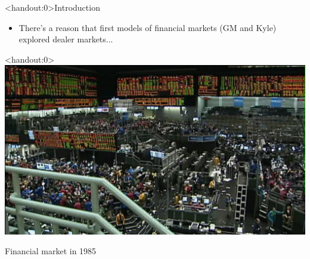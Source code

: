 \documentclass[english,10pt
,aspectratio=169
]{beamer}
\begin{document}




\begin{frame}<handout:0>{Introduction}
	\begin{itemize}
		\item There's a reason that first models of financial markets (GM and Kyle) explored dealer markets...
	\end{itemize}
\end{frame}


\begin{frame}<handout:0>
	\centering
	\includegraphics[scale=0.5]{pics/mkt20}
	
	Financial market in 1985
\end{frame}
\end{document}
